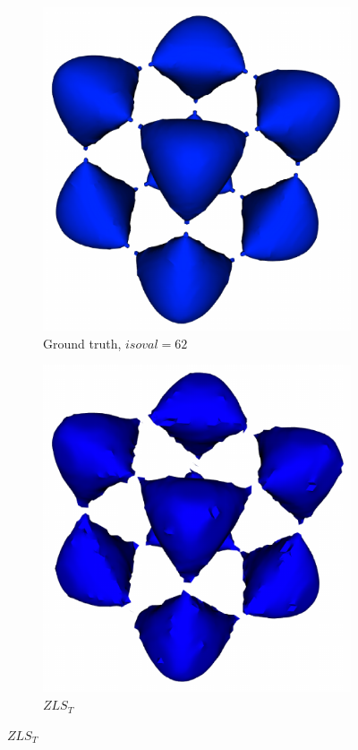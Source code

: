 \begin{figure}[t]
\begin{subfigure}{0.195\linewidth}
\centering
\includegraphics[width=0.8\linewidth]{Images/Tangle/gt.pdf}
\caption{Ground truth, $isoval=62$}
\label{}
\end{subfigure}
\begin{subfigure}{0.195\linewidth}
\centering
\includegraphics[width=0.8\linewidth]{Images/Tangle/zls.pdf}
\caption{$ZLS_{T}$}
\label{}
\end{subfigure}

\end{figure}
